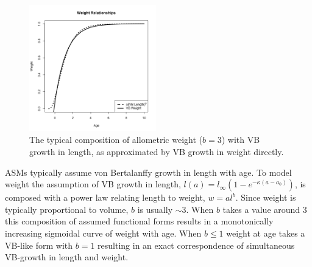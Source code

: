%
\begin{figure} %
\vspace{-1.5cm}
\includegraphics[width=0.49\textwidth]{plots/vbOpt.png}
\vspace{-1cm}
\caption{
The typical composition of allometric weight ($b=3$) with VB growth in length, as
approximated by VB growth in weight directly.
}
\label{vbComp}
\end{figure}

ASMs typically assume von Bertalanffy %
\cite[VB]{von_bertalanffy_quantitative_1938} growth in length with age. To model
weight the assumption of VB growth in length, 
$l(a)=l_\infty(1-e^{-\kappa (a-a_0)})$, 
is composed with a power law relating length to weight, $w=al^b$. 
%
Since weight is typically proportional to volume, $b$ is usually $\sim3$. When 
$b$ takes a value around $3$ this composition of assumed functional forms %
results in a monotonically increasing sigmoidal curve of weight with 
age. When $b\le1$ weight at age takes a VB-like form with $b=1$ resulting in
an exact correspondence of simultaneous VB-growth in length and weight.

